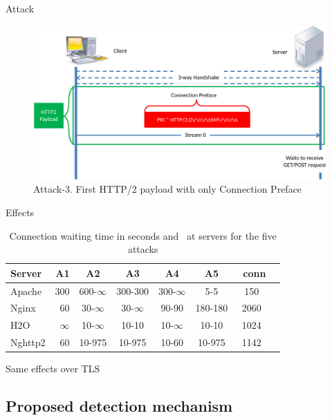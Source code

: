 \documentclass{beamer}
\begin{document}
\begin{frame}{Attack }
  \begin{figure}[t]
    \includegraphics[scale=0.26]{images/attack3.png}
    \caption{Attack-3. First HTTP/2 payload with only Connection Preface}
  \end{figure}
\end{frame}

\begin{frame}{Effects}
\begin{table}
    \caption{Connection waiting time in seconds and \textnumero~at servers for the five attacks}
    \begin{tabular}{@{} lr c c c c c c @{}}
      \toprule
	    Server & A1 & A2 & A3 & A4 & A5 & \textnumero~conn\\
      \midrule
	    Apache & 300 & 600-$\infty$ & 300-300 & 300-$\infty$ & 5-5 & 150\\
	    Nginx & 60 & 30-$\infty$ & 30-$\infty$ & 90-90 & 180-180 & 2060\\
	    H2O & $\infty$ & 10-$\infty$ & 10-10 & 10-$\infty$ & 10-10 & 1024\\
	    Nghttp2 & 60 & 10-975 & 10-975 & 10-60 & 10-975 & 1142\\
      \bottomrule
    \end{tabular}
\end{table}
	\begin{alertblock}{Same effects over TLS}\end{alertblock}
\end{frame}

\subsection{Proposed detection mechanism}
\end{document}
